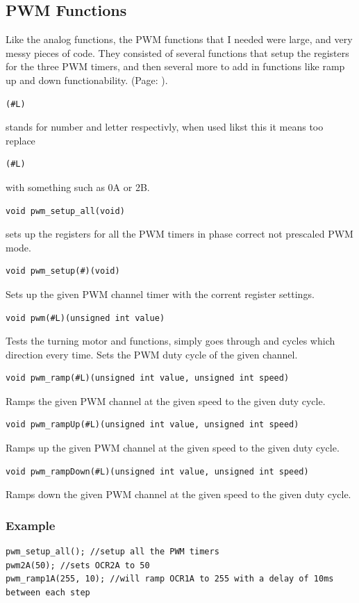 \documentclass{article}
\begin{document}
\subsection{PWM Functions}
Like the analog functions, the PWM functions that I needed were large, and very messy pieces of code. They consisted of several functions that setup the registers for the three PWM timers, and then several more to add in functions like ramp up and down functionability. (Page: \pageref{pwm}).
\begin{verbatim}(#L)\end{verbatim} stands for number and letter respectivly, when used likst this it means too replace \begin{verbatim}(#L)\end{verbatim} with something such as 0A or 2B.
\begin{verbatim}void pwm_setup_all(void)\end{verbatim}
sets up the registers for all the PWM timers in phase correct not prescaled PWM mode.
\begin{verbatim}void pwm_setup(#)(void)\end{verbatim}
Sets up the given PWM channel timer with the corrent register settings.
\begin{verbatim}void pwm(#L)(unsigned int value)\end{verbatim}Tests the turning motor and functions, simply goes through and cycles which direction every time.
Sets the PWM duty cycle of the given channel.
\begin{verbatim}void pwm_ramp(#L)(unsigned int value, unsigned int speed)\end{verbatim}
Ramps the given PWM channel at the given speed to the given duty cycle.
\begin{verbatim}void pwm_rampUp(#L)(unsigned int value, unsigned int speed)\end{verbatim}
Ramps up the given PWM channel at the given speed to the given duty cycle.
\begin{verbatim}void pwm_rampDown(#L)(unsigned int value, unsigned int speed)\end{verbatim}
Ramps down the given PWM channel at the given speed to the given duty cycle.
\subsubsection{Example}
\begin{lstlisting}[caption={PWM examples},label=pwmex,frame=bl]
pwm_setup_all(); //setup all the PWM timers
pwm2A(50); //sets OCR2A to 50
pwm_ramp1A(255, 10); //will ramp OCR1A to 255 with a delay of 10ms between each step

\end{lstlisting}
\end{document}
